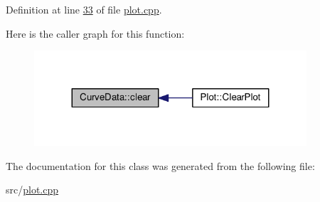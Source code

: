 Definition at line \hyperlink{plot_8cpp_source_l00033}{33} of file \hyperlink{plot_8cpp_source}{plot.\+cpp}.



Here is the caller graph for this function\+:\nopagebreak
\begin{figure}[H]
\begin{center}
\leavevmode
\includegraphics[width=287pt]{classCurveData_ae898810872a274a681ab60131ecf922b_icgraph}
\end{center}
\end{figure}




The documentation for this class was generated from the following file\+:\begin{DoxyCompactItemize}
\item 
src/\hyperlink{plot_8cpp}{plot.\+cpp}\end{DoxyCompactItemize}
